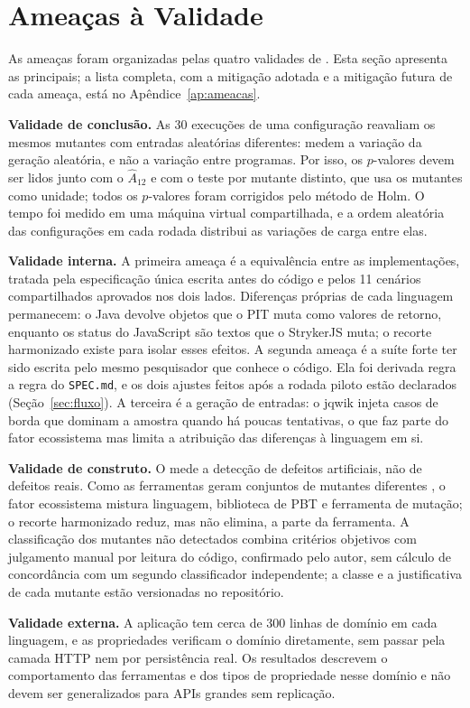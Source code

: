 \section{Ameaças à Validade}

As ameaças foram organizadas pelas quatro validades de \citet{wohlin2012experimentation}. Esta seção apresenta as principais; a lista completa, com a mitigação adotada e a mitigação futura de cada ameaça, está no Apêndice~\ref{ap:ameacas}.

\textbf{Validade de conclusão.} As 30 execuções de uma configuração reavaliam os mesmos mutantes com entradas aleatórias diferentes: medem a variação da geração aleatória, e não a variação entre programas. Por isso, os $p$-valores devem ser lidos junto com o $\hat{A}_{12}$ e com o teste por mutante distinto, que usa os mutantes como unidade; todos os $p$-valores foram corrigidos pelo método de Holm. O tempo foi medido em uma máquina virtual compartilhada, e a ordem aleatória das configurações em cada rodada distribui as variações de carga entre elas.

\textbf{Validade interna.} A primeira ameaça é a equivalência entre as implementações, tratada pela especificação única escrita antes do código e pelos 11 cenários compartilhados aprovados nos dois lados. Diferenças próprias de cada linguagem permanecem: o Java devolve objetos que o PIT muta como valores de retorno, enquanto os status do JavaScript são textos que o StrykerJS muta; o recorte harmonizado existe para isolar esses efeitos. A segunda ameaça é a suíte forte ter sido escrita pelo mesmo pesquisador que conhece o código. Ela foi derivada regra a regra do \texttt{SPEC.md}, e os dois ajustes feitos após a rodada piloto estão declarados (Seção~\ref{sec:fluxo}). A terceira é a geração de entradas: o jqwik injeta casos de borda que dominam a amostra quando há poucas tentativas, o que faz parte do fator ecossistema mas limita a atribuição das diferenças à linguagem em si.

\textbf{Validade de construto.} O \ms{} mede a detecção de defeitos artificiais, não de defeitos reais. Como as ferramentas geram conjuntos de mutantes diferentes \citep{kintis2018tools,monteiro2022tools}, o fator ecossistema mistura linguagem, biblioteca de PBT e ferramenta de mutação; o recorte harmonizado reduz, mas não elimina, a parte da ferramenta. A classificação dos mutantes não detectados combina critérios objetivos com julgamento manual por leitura do código, confirmado pelo autor, sem cálculo de concordância com um segundo classificador independente; a classe e a justificativa de cada mutante estão versionadas no repositório.

\textbf{Validade externa.} A aplicação tem cerca de 300 linhas de domínio em cada linguagem, e as propriedades verificam o domínio diretamente, sem passar pela camada HTTP nem por persistência real. Os resultados descrevem o comportamento das ferramentas e dos tipos de propriedade nesse domínio e não devem ser generalizados para APIs grandes sem replicação.
